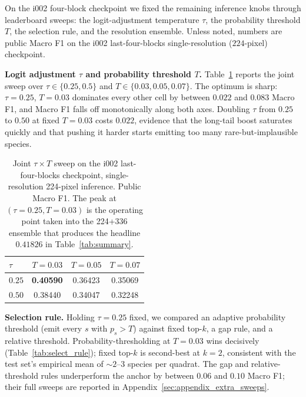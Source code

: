 On the i002 four-block checkpoint we fixed the remaining inference knobs through leaderboard
sweeps: the logit-adjustment temperature $\tau$, the probability threshold $T$, the selection
rule, and the resolution ensemble. Unless noted, numbers are public Macro F1 on the i002
last-four-blocks single-resolution ($224$-pixel) checkpoint.

\textbf{Logit adjustment $\tau$ and probability threshold $T$.} Table~\ref{tab:tau_T} reports
the joint sweep over $\tau \in \{0.25, 0.5\}$ and $T \in \{0.03, 0.05, 0.07\}$. The optimum is
sharp: $\tau{=}0.25$, $T{=}0.03$ dominates every other cell by between $0.022$ and $0.083$ Macro
F1, and Macro F1 falls off monotonically along both axes. Doubling $\tau$ from $0.25$ to $0.50$
at fixed $T{=}0.03$ costs $0.022$, evidence that the long-tail boost saturates quickly and
that pushing it harder starts emitting too many rare-but-implausible species.

\begin{table}[ht]
  \centering
  \small
  \begin{tabular}{lccc}
    \toprule
    $\tau$ & $T{=}0.03$ & $T{=}0.05$ & $T{=}0.07$ \\
    \midrule
    $0.25$ & \textbf{0.40590} & 0.36423 & 0.35069 \\
    $0.50$ & 0.38440 & 0.34047 & 0.32248 \\
    \bottomrule
  \end{tabular}
  \caption{Joint $\tau \times T$ sweep on the i002 last-four-blocks checkpoint, single-resolution 224-pixel inference. Public Macro F1. The peak at $(\tau{=}0.25, T{=}0.03)$ is the operating point taken into the 224+336 ensemble that produces the headline $0.41826$ in Table~\ref{tab:summary}.}
  \label{tab:tau_T}
\end{table}

\textbf{Selection rule.} Holding $\tau{=}0.25$ fixed, we compared an adaptive probability
threshold (emit every $s$ with $p_s > T$) against fixed top-$k$, a gap rule, and a relative
threshold. Probability-thresholding at $T{=}0.03$ wins decisively (Table~\ref{tab:select_rule});
fixed top-$k$ is second-best at $k{=}2$, consistent with the test set's empirical mean of
${\sim}2$--$3$ species per quadrat. The gap and relative-threshold rules underperform the anchor
by between $0.06$ and $0.10$ Macro F1; their full sweeps are reported in
Appendix~\ref{sec:appendix_extra_sweeps}.

